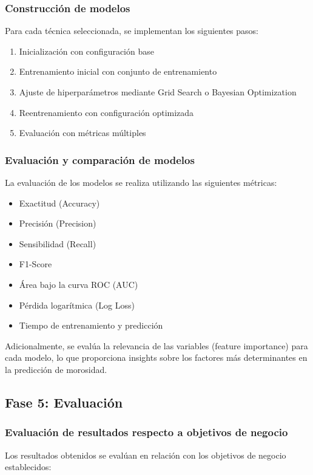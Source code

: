 \subsubsection{Construcción de modelos}
Para cada técnica seleccionada, se implementan los siguientes pasos:

\begin{enumerate}
    \item Inicialización con configuración base
    \item Entrenamiento inicial con conjunto de entrenamiento
    \item Ajuste de hiperparámetros mediante Grid Search o Bayesian Optimization
    \item Reentrenamiento con configuración optimizada
    \item Evaluación con métricas múltiples
\end{enumerate}

\subsubsection{Evaluación y comparación de modelos}
La evaluación de los modelos se realiza utilizando las siguientes métricas:

\begin{itemize}
    \item Exactitud (Accuracy)
    \item Precisión (Precision)
    \item Sensibilidad (Recall)
    \item F1-Score
    \item Área bajo la curva ROC (AUC)
    \item Pérdida logarítmica (Log Loss)
    \item Tiempo de entrenamiento y predicción
\end{itemize}

Adicionalmente, se evalúa la relevancia de las variables (feature importance) para cada modelo, lo que proporciona insights sobre los factores más determinantes en la predicción de morosidad.

\subsection{Fase 5: Evaluación}
\subsubsection{Evaluación de resultados respecto a objetivos de negocio}
Los resultados obtenidos se evalúan en relación con los objetivos de negocio establecidos:

